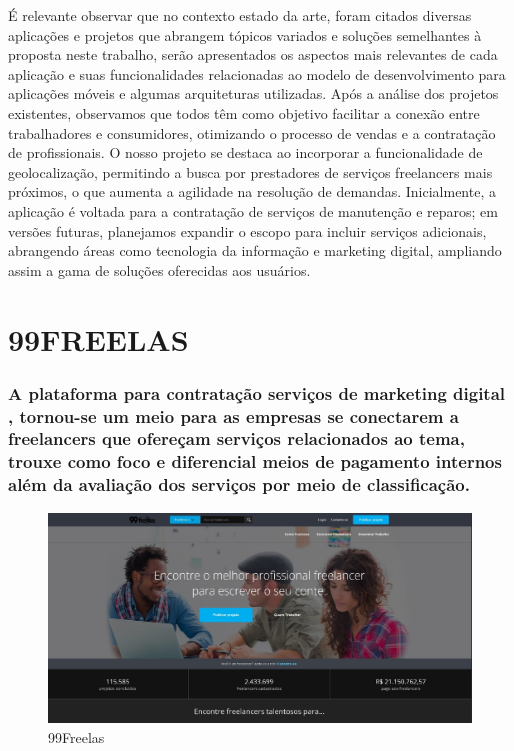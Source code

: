 É relevante observar que no contexto estado da arte, foram citados diversas aplicações e projetos que abrangem tópicos variados e soluções semelhantes à proposta neste trabalho, serão apresentados os aspectos mais relevantes de cada aplicação e suas funcionalidades relacionadas ao modelo de desenvolvimento para aplicações móveis e algumas arquiteturas utilizadas. Após a análise dos projetos existentes, observamos que todos têm como objetivo facilitar a conexão entre trabalhadores e consumidores, otimizando o processo de vendas e a contratação de profissionais. O nosso projeto se destaca ao incorporar a funcionalidade de geolocalização, permitindo a busca por prestadores de serviços freelancers mais próximos, o que aumenta a agilidade na resolução de demandas. Inicialmente, a aplicação é voltada para a contratação de serviços de manutenção e reparos; em versões futuras, planejamos expandir o escopo para incluir serviços adicionais, abrangendo áreas como tecnologia da informação e marketing digital, ampliando assim a gama de soluções oferecidas aos usuários.

\section{99FREELAS}
\subsubsection{A plataforma para contratação serviços de marketing digital \cite{99Freelas}, tornou-se um meio para as empresas se conectarem a freelancers que ofereçam serviços relacionados ao tema, trouxe como foco e diferencial meios de pagamento internos além da avaliação dos serviços por meio de classificação.}

\begin{figure}
\centering
\caption{99Freelas}
\label{fig:99Freelas}
\includegraphics[scale=0.5]{Illustrations/99Freelas.jpg}
\end{figure}

